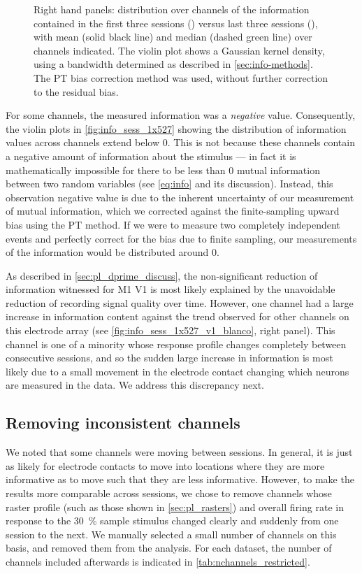 \begin{figure}[htbp]
{Right hand panels: distribution over channels of the information contained in the first three sessions () versus last three sessions (), with mean (solid black line) and median (dashed green line) over channels indicated.
The violin plot shows a Gaussian kernel density, using a bandwidth determined as described in \autoref{sec:info-methods}.
The \ac{PT} bias correction method was used, without further correction to the residual bias.
}
    \label{fig:info_sess_1x527}
\end{figure}


For some channels, the measured information was a \textit{negative} value.
Consequently, the violin plots in \autoref{fig:info_sess_1x527} showing the distribution of information values across channels extend below \num{0}.
This is not because these channels contain a negative amount of information about the stimulus --- in fact it is mathematically impossible for there to be less than \num{0} mutual information between two random variables (see \autoref{eq:info} and its discussion).
Instead, this observation negative value is due to the inherent uncertainty of our measurement of mutual information, which we corrected against the finite-sampling upward bias using the \ac{PT} method.
If we were to measure two completely independent events and perfectly correct for the bias due to finite sampling, our measurements of the information would be distributed around \num{0}.

As described in \autoref{sec:pl_dprime_discuss}, the non-significant reduction of information witnessed for \ac{M1} \ac{V1} is most likely explained by the unavoidable reduction of recording signal quality over time.
However, one channel had a large increase in information content against the trend observed for other channels on this electrode array (see \autoref{fig:info_sess_1x527_v1_blanco}, right panel).
This channel is one of a minority whose response profile changes completely between consecutive sessions, and so the sudden large increase in information is most likely due to a small movement in the electrode contact changing which neurons are measured in the data.
We address this discrepancy next.


\subsection{Removing inconsistent channels}

We noted that some channels were moving between sessions.
In general, it is just as likely for electrode contacts to move into locations where they are more informative as to move such that they are less informative.
However, to make the results more comparable across sessions, we chose to remove channels whose raster profile (such as those shown in \autoref{sec:pl_rasters}) and overall firing rate in response to the \SI{30}{\percent} sample stimulus changed clearly and suddenly from one session to the next.
We manually selected a small number of channels on this basis, and removed them from the analysis.
For each dataset, the number of channels included afterwards is indicated in \autoref{tab:nchannels_restricted}.


